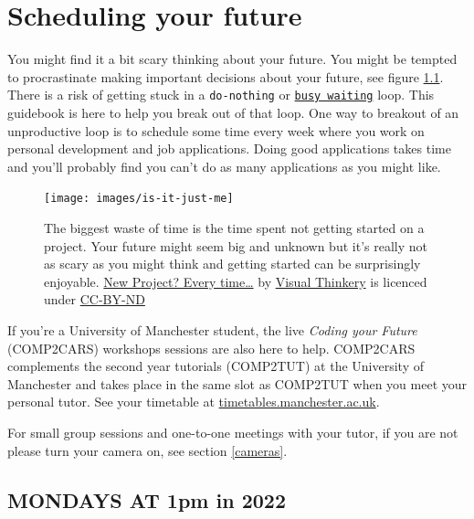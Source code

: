 \documentclass[
]{book}
\begin{document}
\hypertarget{scheduling}{%
\chapter{Scheduling your future}\label{scheduling}}

You might find it a bit scary thinking about your future. You might be tempted to procrastinate making important decisions about your future, see figure \ref{fig:schedule-fig}. There is a risk of getting stuck in a \texttt{do-nothing} or \href{https://en.wikipedia.org/wiki/Busy_waiting}{\texttt{busy\ waiting}} loop. This guidebook is here to help you break out of that loop. One way to breakout of an unproductive loop is to schedule some time every week where you work on personal development and job applications. Doing good applications takes time and you'll probably find you can't do as many applications as you might like.

\begin{figure}

{\centering \texttt{[image: images/is-it-just-me]} 

}

\caption{The biggest waste of time is the time spent not getting started on a project. Your future might seem big and unknown but it's really not as scary as you might think and getting started can be surprisingly enjoyable. \href{https://bryanmmathers.com/new-project-every-time/}{New Project? Every time\ldots{}} by \href{https://visualthinkery.com/}{Visual Thinkery} is licenced under \href{https://creativecommons.org/licenses/by-nd/4.0/}{CC-BY-ND}}\label{fig:schedule-fig}
\end{figure}



If you're a University of Manchester student, the live \emph{Coding your Future} (COMP2CARS) workshops sessions are also here to help.
COMP2CARS complements the second year tutorials (COMP2TUT) at the University of Manchester and takes place in the same slot as COMP2TUT when you meet your personal tutor. See your timetable at \href{https://timetables.manchester.ac.uk/}{timetables.manchester.ac.uk}.

For small group sessions and one-to-one meetings with your tutor, if you are not please turn your camera on, see section \ref{cameras}.

\hypertarget{mondays}{%
\section{MONDAYS AT 1pm in 2022}\label{mondays}}
\end{document}
